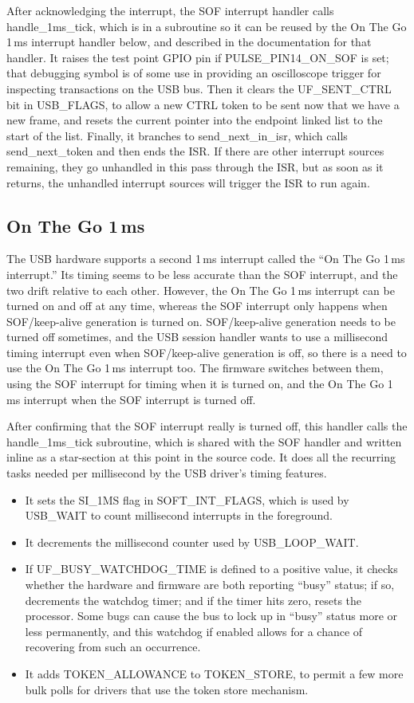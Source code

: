 After acknowledging the interrupt, the SOF interrupt handler calls
handle\_1ms\_tick, which is in a subroutine so it can be reused by the
On The Go 1\,ms interrupt handler below, and described in the documentation
for that handler.  It raises the test point GPIO pin if PULSE\_PIN14\_ON\_SOF
is set; that debugging symbol is of some use in providing an oscilloscope
trigger for inspecting transactions on the USB bus.  Then it clears the
UF\_SENT\_CTRL bit in USB\_FLAGS, to allow a new CTRL token to be sent now
that we have a new frame, and resets the current pointer into the endpoint
linked list to the start of the list.  Finally, it branches to
send\_next\_in\_isr, which calls send\_next\_token and then ends the ISR. 
If there are other interrupt sources remaining, they go unhandled in this
pass through the ISR, but as soon as it returns, the unhandled interrupt
sources will trigger the ISR to run again.

\subsection{On The Go 1\,ms}

The USB hardware supports a second 1\,ms interrupt called the ``On The Go
1\,ms interrupt.'' Its timing seems to be less accurate than the SOF
interrupt, and the two drift relative to each other.  However, the On The Go
1\,ms interrupt can be turned on and off at any time, whereas the SOF
interrupt only happens when SOF/keep-alive generation is turned on. 
SOF/keep-alive generation needs to be turned off sometimes, and the USB
session handler wants to use a millisecond timing interrupt even when
SOF/keep-alive generation is off, so there is a need to use the On The Go
1\,ms interrupt too.  The firmware switches between them, using the SOF
interrupt for timing when it is turned on, and the On The Go
1\,ms interrupt when the SOF interrupt is turned off.

After confirming that the SOF interrupt really is turned off, this handler
calls the handle\_1ms\_tick subroutine, which is shared with the SOF handler
and written inline as a star-section at this point in the source code.  It
does all the recurring tasks needed per millisecond by the USB driver's
timing features.
\begin{itemize}
\item It sets the SI\_1MS flag in SOFT\_INT\_FLAGS, which is used by
  USB\_WAIT to count millisecond interrupts in the foreground.
\item It decrements the millisecond counter used by USB\_LOOP\_WAIT.
\item If UF\_BUSY\_WATCHDOG\_TIME is defined to a positive value, it
  checks whether the hardware and firmware are both reporting ``busy''
  status; if so, decrements the watchdog timer; and if the timer hits zero,
  resets the processor.  Some bugs can cause the bus to lock up in ``busy''
  status more or less permanently, and this watchdog if enabled allows for a
  chance of recovering from such an occurrence.
\item It adds TOKEN\_ALLOWANCE to TOKEN\_STORE, to permit a few more bulk
  polls for drivers that use the token store mechanism.
\end{itemize}

